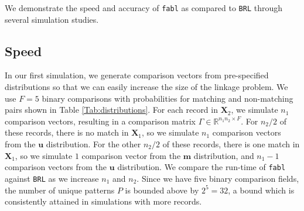 \documentclass[ba]{imsart}
\begin{document}
	We demonstrate the speed and accuracy of \texttt{fabl} as compared to \texttt{BRL} through several simulation studies. 
	
	\hypertarget{speed}{%
		\subsection{Speed}\label{speed}}
	
	In our first simulation, we generate comparison vectors from pre-specified distributions so that we can easily increase the size of the linkage problem. We use $F = 5$ binary comparisons with probabilities for matching and non-matching pairs shown in Table \ref{Tab:distributions}. For each record in $\bm{X}_2$, we simulate $n_1$ comparison vectors, resulting in a comparison matrix $\Gamma \in \mathbb{R}^{n_1 n_2 \times F}$. For $n_2/2$ of these records, there is no match in $\bm{X}_1$, so we simulate $n_1$ comparison vectors from the $\bm{u}$ distribution. For the other $n_2/2$ of these records, there is one match in $\bm{X}_1$, so we simulate $1$ comparison vector from the $\bm{m}$ distribution, and $n_1 - 1$ comparison vectors from the $\bm{u}$ distribution. We compare the run-time of \texttt{fabl} against \texttt{BRL} as we increase $n_1$ and $n_2$. Since we have five binary comparison fields, the number of unique patterns \(P\) is bounded above by \(2^5 = 32\), a bound which is consistently attained in simulations with more records.
	
	
	
\end{document}
